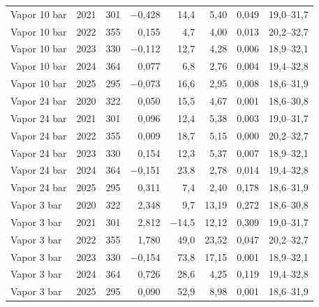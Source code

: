 {\begin{xltabular}{\linewidth}{@{}lrrrrrrr@{}}
Vapor 10 bar & 2021 & 301 & $-$0,428 & 14,4 & 5,40 & 0,049 & 19,0--31,7 \\
Vapor 10 bar & 2022 & 355 & 0,155 & 4,7 & 4,00 & 0,013 & 20,2--32,7 \\
Vapor 10 bar & 2023 & 330 & $-$0,112 & 12,7 & 4,28 & 0,006 & 18,9--32,1 \\
Vapor 10 bar & 2024 & 364 & 0,077 & 6,8 & 2,76 & 0,004 & 19,4--32,8 \\
Vapor 10 bar & 2025 & 295 & $-$0,073 & 16,6 & 2,95 & 0,008 & 18,6--31,9 \\
Vapor 24 bar & 2020 & 322 & 0,050 & 15,5 & 4,67 & 0,001 & 18,6--30,8 \\
Vapor 24 bar & 2021 & 301 & 0,096 & 12,4 & 5,38 & 0,003 & 19,0--31,7 \\
Vapor 24 bar & 2022 & 355 & 0,009 & 18,7 & 5,15 & 0,000 & 20,2--32,7 \\
Vapor 24 bar & 2023 & 330 & 0,154 & 12,3 & 5,37 & 0,007 & 18,9--32,1 \\
Vapor 24 bar & 2024 & 364 & $-$0,151 & 23,8 & 2,78 & 0,014 & 19,4--32,8 \\
Vapor 24 bar & 2025 & 295 & 0,311 & 7,4 & 2,40 & 0,178 & 18,6--31,9 \\
Vapor 3 bar & 2020 & 322 & 2,348 & 9,7 & 13,19 & 0,272 & 18,6--30,8 \\
Vapor 3 bar & 2021 & 301 & 2,812 & $-$14,5 & 12,12 & 0,309 & 19,0--31,7 \\
Vapor 3 bar & 2022 & 355 & 1,780 & 49,0 & 23,52 & 0,047 & 20,2--32,7 \\
Vapor 3 bar & 2023 & 330 & $-$0,154 & 73,8 & 17,15 & 0,001 & 18,9--32,1 \\
Vapor 3 bar & 2024 & 364 & 0,726 & 28,6 & 4,25 & 0,119 & 19,4--32,8 \\
Vapor 3 bar & 2025 & 295 & 0,090 & 52,9 & 8,98 & 0,001 & 18,6--31,9 \\
\end{xltabular}
}
